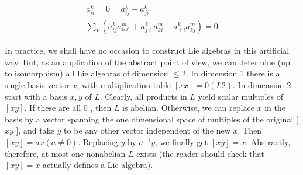 \documentclass[10pt]{article}
\begin{document}
$$
\begin{gathered}
a_{i i}^{k}=0=a_{i j}^{k}+a_{j i}^{k} \\
\sum_{k}\left(a_{i j}^{k} a_{k \ell}^{m}+a_{j \ell}^{k} a_{k i}^{m}+a_{\ell i}^{k} a_{k j}^{m}\right)=0
\end{gathered}
$$

In practice, we shall have no occasion to construct Lie algebras in this artificial way. But, as an application of the abstract point of view, we can determine (up to isomorphism) all Lie algebras of dimension $\leq 2$. In dimension 1 there is a single basis vector $x$, with multiplication table $[x x]=0(L 2)$. In dimension 2, start with a basis $x, y$ of $L$. Clearly, all products in $L$ yield scalar multiples of $[x y]$. If these are all 0 , then $L$ is abelian. Otherwise, we can replace $x$ in the basis by a vector spanning the one dimensional space of multiples of the original [ $x y$ ], and take $y$ to be any other vector independent of the new $x$. Then $[x y]=a x(a \neq 0)$. Replacing $y$ by $a^{-1} y$, we finally get $[x y]=x$. Abstractly, therefore, at most one nonabelian $L$ exists (the reader should check that $[x y]=x$ actually defines a Lie algebra).
\end{document}
